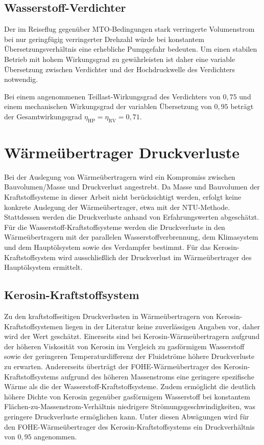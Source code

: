 \subsection{Wasserstoff-Verdichter}

Der im Reiseflug gegenüber MTO-Bedingungen stark verringerte Volumenstrom bei nur geringfügig verringerter Drehzahl würde bei konstantem Übersetzungsverhältnis eine erhebliche Pumpgefahr bedeuten. Um einen stabilen Betrieb mit hohem Wirkungsgrad zu gewährleisten ist daher eine variable Übersetzung zwischen Verdichter und der Hochdruckwelle des Verdichters notwendig. 

Bei einem angenommenen Teillast-Wirkungsgrad des Verdichters von $0,75$ und einem mechanischen Wirkungsgrad der variablen Übersetzung von $0,95$ beträgt der Gesamtwirkungsgrad $\eta_{\mathrm{HP}}=\eta_\mathrm{RV}=0,71$.

\section{Wärmeübertrager Druckverluste}

Bei der Auslegung von Wärmeübertragern wird ein Kompromiss zwischen Bauvolumen/Masse und Druckverlust angestrebt. Da Masse und Bauvolumen der Kraftstoffsysteme in dieser Arbeit nicht berücksichtigt werden, erfolgt keine konkrete Auslegung der Wärmeübertrager, etwa mit der NTU-Methode. Stattdessen werden die Druckverluste anhand von Erfahrungswerten abgeschätzt. Für die Wasserstoff-Kraftstoffsysteme werden die Druckverluste in den Wärmeübertragern mit der parallelen Wasserstoffverbrennung, dem Klimasystem und dem Hauptölsystem sowie des Verdampfer bestimmt. Für das Kerosin-Kraftstoffsystem wird ausschließlich der Druckverlust im Wärmeübertrager des Hauptölsystem ermittelt.

\subsection{Kerosin-Kraftstoffsystem}

Zu den kraftstoffseitigen Druckverlusten in Wärmeübertragern von Kerosin-Kraftstoffsystemen liegen in der Literatur keine zuverlässigen Angaben vor, daher wird der Wert geschätzt. Einerseits sind bei Kerosin-Wärmeübertragern aufgrund der höheren Viskosität von Kerosin im Vergleich zu gasförmigem Wasserstoff sowie der geringeren Temperaturdifferenz der Fluidströme höhere Druckverluste zu erwarten. Andererseits überträgt der FOHE-Wärmeübertrager des Kerosin-Kraftstoffsystems aufgrund des höheren Massenstroms eine geringere spezifische Wärme als die der Wasserstoff-Kraftstoffsysteme. Zudem ermöglicht die deutlich höhere Dichte von Kerosin gegenüber gasförmigem Wasserstoff bei konstantem Flächen-zu-Massenstrom-Verhältnis niedrigere Strömungsgeschwindigkeiten, was geringere Druckverluste ermöglichen kann. Unter diesen Abwägungen wird für den FOHE-Wärmeübertrager des Kerosin-Kraftstoffsystems ein Druckverhältnis von $0,95$ angenommen.

